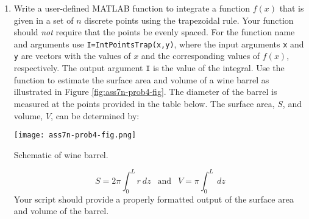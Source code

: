 \begin{enumerate}[resume]

\item Write a user-defined MATLAB function to integrate a function $f(x)$ that is given in a set of $n$ discrete points using the trapezoidal rule.  Your function should \emph{not} require that the points be evenly spaced.  For the function name and arguments use \lstinline[style=myMatlab]{I=IntPointsTrap(x,y)}, where the input arguments \lstinline[style=myMatlab]{x} and \lstinline[style=myMatlab]{y} are vectors with the values of $x$ and the corresponding values of $f(x)$, respectively.  The output argument \lstinline[style=myMatlab]{I} is the value of the integral.  Use the function to estimate the surface area and volume of a wine barrel as illustrated in Figure \ref{fig:ass7n-prob4-fig}.  The diameter of the barrel is measured at the points provided in the table below.  The surface area, $S$, and volume, $V$, can be determined by:


\begin{marginfigure}
\texttt{[image: ass7n-prob4-fig.png]}
\caption{Schematic of wine barrel.}
\label{fig:ass7n-prob4-fig}
\end{marginfigure}

\begin{equation*}
S = 2 \pi \int_{0}^{L} r \ dz \ \ \text{ and } \ \ V = \pi\int_{0}^{L} \ dz
\end{equation*}
Your script should provide a properly formatted output of the surface area and volume of the barrel.
\end{enumerate}

\pagebreak


